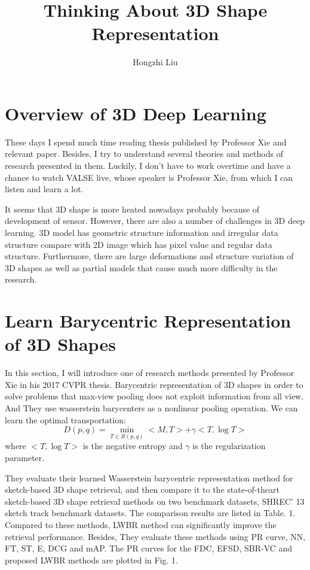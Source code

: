 \documentclass{article}
\author{Hongzhi Liu}
\title{Thinking About 3D Shape Representation}
\begin{document}
\maketitle
  \par
  \section{Overview of 3D Deep Learning}
  These days I spend much time reading thesis published by Professor Xie and relevant paper. Besides, I try to understand several theories and methods of research presented in them. Luckily, I don't have to work overtime and have a chance to watch VALSE live, whose speaker is Professor Xie, from which I can listen and learn a lot.

  It seems that 3D shape is more heated nowadays probably because of development of sensor. However, there are also a number of challenges in 3D deep learning. 3D model has geometric structure information and irregular data structure compare with 2D image which has pixel value and regular data structure. Furthermore, there are large deformations and structure variation of 3D shapes as well as partial models that cause much more difficulty in the research.

\section{Learn Barycentric Representation of 3D Shapes}

  In this section, I will introduce one of research methods presented by Professor Xie in his 2017 CVPR thesis. Barycentric representation of 3D shapes in order to solve problems that max-view pooling does not exploit information from all view. And They use wasserstein barycenters as a nonlinear pooling operation. We can learn the optimal transportation\cite{Cuturi2013Sinkhorn}:
\begin{equation}
  D(p,q) = \min_{T \in R(p,q)}<M,T> + \gamma<T,\log T>
 \end{equation}
  where $ < T,\log T > $ is the negative entropy and $ \gamma $ is the regularization parameter.

  They evaluate their learned Wasserstein barycentric representation method for sketch-based 3D shape retrieval, and then compare it to the state-of-theart sketch-based 3D shape retrieval methods on two benchmark datasets, SHREC' 13 sketch track benchmark datasets. The comparison results are listed in Table. 1. Compared to these methods, LWBR method can significantly improve the retrieval performance. Besides, They evaluate these methods using PR curve, NN, FT, ST, E, DCG and mAP. The PR curves for the FDC, EFSD, SBR-VC and proposed LWBR methods are plotted in Fig. 1.
\end{document}
